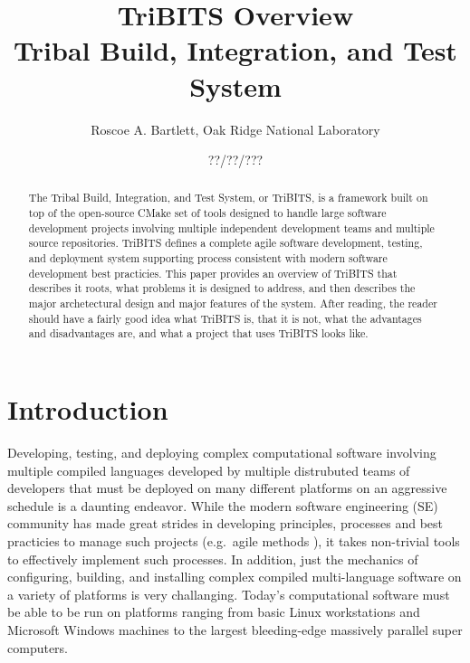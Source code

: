\documentclass[10pt]{article}
\title{
TriBITS Overview \\
Tribal Build, Integration, and Test System
}
\author{Roscoe A. Bartlett, Oak Ridge National Laboratory}
\date{??/??/???}
\begin{document}
\maketitle

\begin{abstract}

The Tribal Build, Integration, and Test System, or TriBITS, is a framework built on top of the open-source CMake set of tools designed to handle large software development projects involving multiple independent development teams and multiple source repositories.  TriBITS defines a complete agile software development, testing, and deployment system supporting process consistent with modern software development best practicies.  This paper provides an overview of TriBITS that describes it roots, what problems it is designed to address, and then describes the major archetectural design and major features of the system.  After reading, the reader should have a fairly good idea what TriBITS is, that it is not, what the advantages and disadvantages are, and what a project that uses TriBITS looks like.

\end{abstract}

\tableofcontents

%
\section{Introduction}
%

Developing, testing, and deploying complex computational software involving multiple compiled languages developed by multiple distrubuted teams of developers that must be deployed on many different platforms on an aggressive schedule is a daunting endeavor.  While the modern software engineering (SE) community has made great strides in developing principles, processes and best practicies to manage such projects (e.g.\ agile methods \cite{CodeComplete2nd04, AgileSoftwareDevelopment, ContinuousIntegration07, XP2, TDD}), it takes non-trivial tools to effectively implement such processes.  In addition, just the mechanics of configuring, building, and installing complex compiled multi-language software on a variety of platforms is very challanging.  Today's computational software must be able to be run on platforms ranging from basic Linux workstations and Microsoft Windows machines to the largest bleeding-edge massively parallel super computers.
\end{document}
